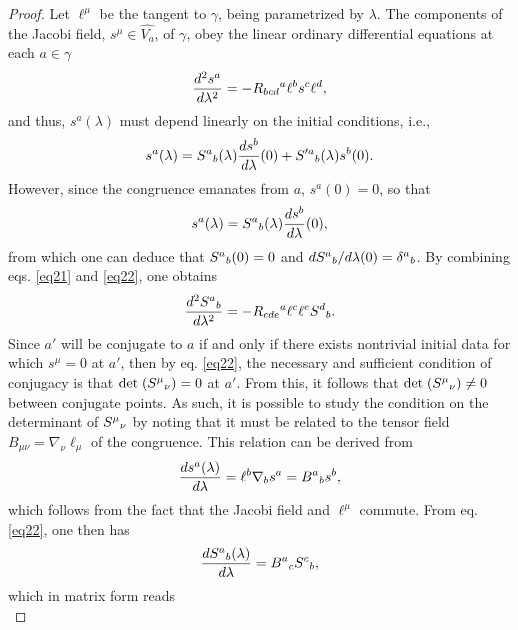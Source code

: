 \documentclass[
12pt,		%
openright,	%
twoside,  %
a4paper,			%
chapter=TITLE,		%
english,			%
french,				%
spanish,			%
brazil				%
]{USPSC-classe/USPSC}
\begin{document}
\begin{proof}
    Let $\ell^{\mu}$ be the tangent to $\gamma$, being parametrized by $\lambda$. The components of the Jacobi field, $s^{\mu}\in\hat{V_a}$, of $\gamma$, obey the linear ordinary differential equations at each $a\in\gamma$
\begin{equation}\label{eq21}
   \frac{d^2 s^a}{d\lambda^2}=-R_{bcd}\mathstrut^{a}\ell^{b}s^{c}\ell^{d},
\end{equation}
and thus, $s^a(\lambda)$ must depend linearly on the initial conditions, i.e.,
\begin{equation}
    s^a(\lambda)=S^a\mathstrut_b(\lambda)\frac{ds^{b}}{d\lambda}(0)+S'^a\mathstrut_b(\lambda)s^b(0).
\end{equation}
However, since the congruence emanates from $a$, $s^a(0)=0$, so that
\begin{equation}\label{eq22}
   s^a(\lambda)=S^a\mathstrut_b(\lambda)\frac{ds^{b}}{d\lambda}(0),
\end{equation}
from which one can deduce that $S^{a}\mathstrut_{b}(0)=0$ and $dS^{a}\mathstrut_{b}/d\lambda(0)=\delta^{a}\mathstrut_b$. By combining eqs. \ref{eq21} and \ref{eq22}, one obtains
\begin{equation}\label{eq23}
   \frac{d^2S^{a}\mathstrut_{b}}{d\lambda^2}=-R_{cde}\mathstrut^{a}\ell^{c}\ell^{e}S^{d}\mathstrut_{b}.
\end{equation}
Since $a'$ will be conjugate to $a$ if and only if there exists nontrivial initial data for which $s^{\mu}=0$ at $a'$, then by eq. \ref{eq22}, the necessary and sufficient condition of conjugacy is that $\text{det}\;(S^{\mu}\mathstrut_{\nu})=0$ at $a'$. From this, it follows that $\text{det}\;(S^{\mu}\mathstrut_{\nu})\neq0$ between conjugate points. As such, it is possible to study the condition on the determinant of $S^{\mu}\mathstrut_{\nu}$ by noting that it must be related to the tensor field $B_{\mu\nu}=\nabla_{\nu}\ell_{\mu}$ of the congruence. This relation can be derived from
\begin{equation}
    \frac{ds^{a}(\lambda)}{d\lambda}=\ell^{b}\nabla_{b}s^{a}=B^{a}\mathstrut_{b}s^{b},
\end{equation}
which follows from the fact that the Jacobi field and $\ell^{\mu}$ commute. From eq. \ref{eq22}, one then has
\begin{equation}
    \frac{dS^{a}\mathstrut_{b}(\lambda)}{d\lambda}=B^{a}\mathstrut_{c}S^{c}\mathstrut_{b},
\end{equation}
which in matrix form reads
\begin{equation}

\end{equation}
\end{proof}
\end{document}
